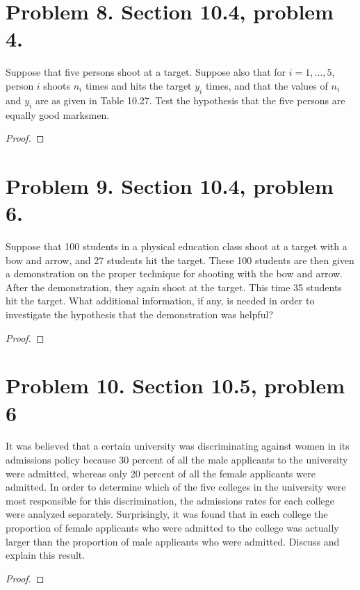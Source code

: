 \documentclass{article}
\newenvironment{hwproof}[1]
{
    #1
    \begin{proof}
}{
    \end{proof}
}
\begin{document}
\section*{Problem 8. Section 10.4, problem 4.}
\begin{hwproof}
    {
        Suppose that five persons shoot at a target. Suppose also that for
        $i=1,\dots,5$, person $i$ shoots $n_i$ times and hits the target $y_i$ times,
        and that the values of $n_i$ and $y_i$ are as given in Table 10.27. Test the
        hypothesis that the five persons are equally good marksmen.
    }
\end{hwproof}
\section*{Problem 9. Section 10.4, problem 6.}
\begin{hwproof}
    {
        Suppose that 100 students in a physical education class shoot at a target with a
        bow and arrow, and 27 students hit the target. These 100 students are then given
        a demonstration on the proper technique for shooting with the bow and arrow. After
        the demonstration, they again shoot at the target. This time 35 students hit
        the target. What additional information, if any, is needed in order to investigate
        the hypothesis that the demonstration was helpful?
    }
\end{hwproof}
\section*{Problem 10. Section 10.5, problem 6}
\begin{hwproof}
    {
        It was believed that a certain university was discriminating against women in
        its admissions policy because 30 percent of all the male applicants to the
        university were admitted, whereas only 20 percent of all the female applicants
        were admitted. In order to determine which of the five colleges in the
        university were most responsible for this discrimination, the admissions
        rates for each college were analyzed separately. Surprisingly, it was found
        that in each college the proportion of female applicants who were admitted
        to the college was actually larger than the proportion of male applicants who
        were admitted. Discuss and explain this result.
    }
\end{hwproof}
\end{document}

